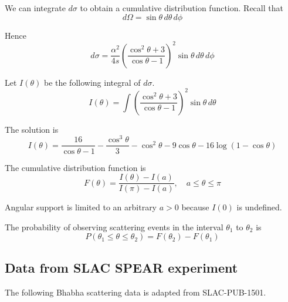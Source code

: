 \documentclass[12pt]{article}
\begin{document}
\noindent
We can integrate $d\sigma$ to obtain a cumulative distribution function.
Recall that
\begin{equation*}
d\Omega=\sin\theta\,d\theta\,d\phi
\end{equation*}

\noindent
Hence
\begin{equation*}
d\sigma=\frac{\alpha^2}{4s}
\left(
\frac{\cos^2\theta+3}{\cos\theta-1}
\right)^2
\sin\theta\,d\theta\,d\phi
\end{equation*}

\bigskip
\noindent
Let $I(\theta)$ be the following integral of $d\sigma$.
\begin{equation*}
I(\theta)=\int
\left(
\frac{\cos^2\theta+3}{\cos\theta-1}
\right)^2
\sin\theta\,d\theta
\end{equation*}


The solution is
\begin{equation*}
I(\theta)=\frac{16}{\cos\theta-1}-\frac{\cos^3\theta}{3}-\cos^2\theta-9\cos\theta-16\log(1-\cos\theta)
\end{equation*}

\noindent
The cumulative distribution function is
\begin{equation*}
F(\theta)=\frac{I(\theta)-I(a)}{I(\pi)-I(a)},
\quad
a\le\theta\le\pi
\end{equation*}

Angular support is limited to an arbitrary $a>0$ because $I(0)$ is undefined.

\bigskip
\noindent
The probability of observing scattering events in the interval $\theta_1$ to $\theta_2$ is
\begin{equation*}
P(\theta_1\le\theta\le\theta_2)=F(\theta_2)-F(\theta_1)
\end{equation*}

\subsection*{Data from SLAC SPEAR experiment}
\noindent
The following Bhabha scattering data is adapted from SLAC-PUB-1501.
\end{document}
